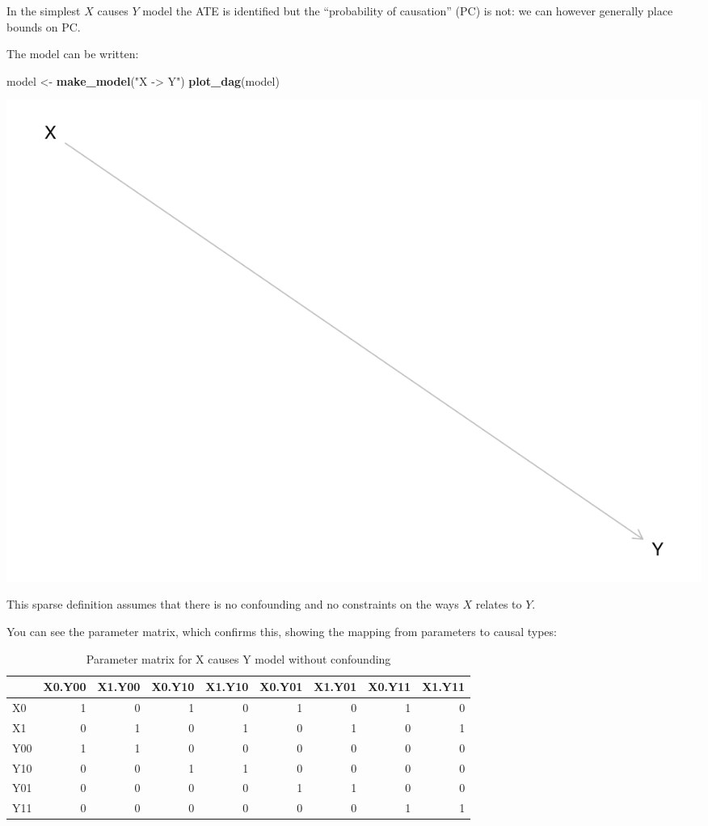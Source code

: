 \documentclass[12pt,]{book}
\newenvironment{Shaded}{\begin{snugshade}}{\end{snugshade}}
\newcommand{\KeywordTok}[1]{\textcolor[rgb]{0.13,0.29,0.53}{\textbf{#1}}}
\newcommand{\NormalTok}[1]{#1}
\newcommand{\StringTok}[1]{\textcolor[rgb]{0.31,0.60,0.02}{#1}}
\begin{document}
In the simplest \(X\) causes \(Y\) model the ATE is identified but the ``probability of causation'' (PC) is not: we can however generally place bounds on PC.

The model can be written:

\begin{Shaded}
\begin{Highlighting}[]
\NormalTok{model <-}\StringTok{ }\KeywordTok{make_model}\NormalTok{(}\StringTok{"X -> Y"}\NormalTok{)}
\KeywordTok{plot_dag}\NormalTok{(model)}
\end{Highlighting}
\end{Shaded}

\includegraphics{ii_files/figure-latex/unnamed-chunk-95-1.pdf}

This sparse definition assumes that there is no confounding and no constraints on the ways \(X\) relates to \(Y\).

You can see the parameter matrix, which confirms this, showing the mapping from parameters to causal types:

\begin{table}[t]

\caption{\label{tab:unnamed-chunk-97}Parameter matrix for X causes Y model without confounding}
\centering
\begin{tabular}{l|r|r|r|r|r|r|r|r}
\hline
  & X0.Y00 & X1.Y00 & X0.Y10 & X1.Y10 & X0.Y01 & X1.Y01 & X0.Y11 & X1.Y11\\
\hline
X0 & 1 & 0 & 1 & 0 & 1 & 0 & 1 & 0\\
\hline
X1 & 0 & 1 & 0 & 1 & 0 & 1 & 0 & 1\\
\hline
Y00 & 1 & 1 & 0 & 0 & 0 & 0 & 0 & 0\\
\hline
Y10 & 0 & 0 & 1 & 1 & 0 & 0 & 0 & 0\\
\hline
Y01 & 0 & 0 & 0 & 0 & 1 & 1 & 0 & 0\\
\hline
Y11 & 0 & 0 & 0 & 0 & 0 & 0 & 1 & 1\\
\hline
\end{tabular}
\end{table}
\end{document}
